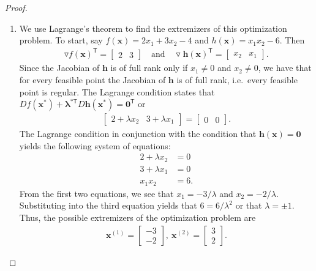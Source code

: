 \documentclass[12pt]{article}
\theoremstyle{definition}
\newcommand{\vc}[1]{\boldsymbol{#1}}
\newcommand{\tran}{\mathsf{T}}
\begin{document}
\begin{proof}
  \begin{enumerate}
    \item We use Lagrange's theorem to find the extremizers of this optimization problem.
      To start, say $f(\vc{x}) = 2x_1 + 3x_2 - 4$ and $h(\vc{x}) = x_1 x_2 - 6$.
      Then
      \begin{align*}
        \triangledown f(\vc{x})^\tran = \begin{bmatrix}2 & 3\end{bmatrix}
        \quad \text{and} \quad
        \triangledown \vc{h}(\vc{x})^\tran = \begin{bmatrix}x_2 & x_1\end{bmatrix}.
      \end{align*}
      Since the Jacobian of $\vc{h}$ is of full rank only if $x_1 \neq 0$ and $x_2 \neq 0$, we have that for every
      feasible point the Jacobian of $\vc{h}$ is of full rank, i.e.\ every feasible point is regular.
      The Lagrange condition states that $D f(\vc{x}^*) + \vc{\lambda}^{*\tran} D \vc{h}(\vc{x}^*) = \vc{0}^\tran$
      or
      \begin{align*}
        \begin{bmatrix}2 + \lambda x_2 & 3 + \lambda x_1\end{bmatrix} = \begin{bmatrix}0 & 0\end{bmatrix}.
      \end{align*}
      The Lagrange condition in conjunction with the condition that $\vc{h}(\vc{x}) = \vc{0}$ yields the following
      system of equations:
      \begin{align*}
        2 + \lambda x_2 &= 0 \\
        3 + \lambda x_1 &= 0 \\
        x_1 x_2 &= 6.
      \end{align*}
      From the first two equations, we see that $x_1 = -3/\lambda$ and $x_2 = -2/\lambda$. Substituting into the
      third equation yields that $6 = 6/\lambda^2$ or that $\lambda=\pm 1$. Thus, the possible extremizers of
      the optimization problem are
      \begin{align}\label{extremizers}
        \vc{x}^{(1)} = \begin{bmatrix}-3 \\ -2\end{bmatrix} ,\
        \vc{x}^{(2)} = \begin{bmatrix}3 \\ 2\end{bmatrix}.

\end{align}
\end{enumerate}
\end{proof}
\end{document}
